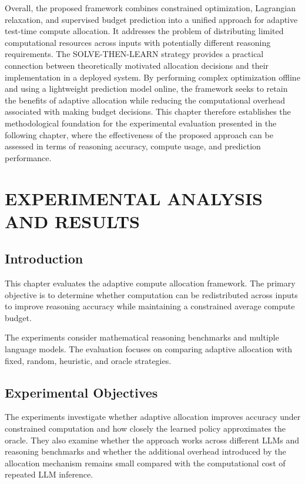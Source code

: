 \documentclass[12pt,a4paper,titlepage]{report}
\begin{document}
Overall, the proposed framework combines constrained optimization, Lagrangian relaxation, and supervised budget prediction into a unified approach for adaptive test-time compute allocation. It addresses the problem of distributing limited computational resources across inputs with potentially different reasoning requirements. The SOLVE-THEN-LEARN strategy provides a practical connection between theoretically motivated allocation decisions and their implementation in a deployed system. By performing complex optimization offline and using a lightweight prediction model online, the framework seeks to retain the benefits of adaptive allocation while reducing the computational overhead associated with making budget decisions. This chapter therefore establishes the methodological foundation for the experimental evaluation presented in the following chapter, where the effectiveness of the proposed approach can be assessed in terms of reasoning accuracy, compute usage, and prediction performance.


\chapter{EXPERIMENTAL ANALYSIS AND RESULTS}

\section{Introduction}

This chapter evaluates the adaptive compute allocation framework. The primary objective is to determine whether computation can be redistributed across inputs to improve reasoning accuracy while maintaining a constrained average compute budget.

The experiments consider mathematical reasoning benchmarks and multiple language models. The evaluation focuses on comparing adaptive allocation with fixed, random, heuristic, and oracle strategies.

\section{Experimental Objectives}

The experiments investigate whether adaptive allocation improves accuracy under constrained computation and how closely the learned policy approximates the oracle. They also examine whether the approach works across different LLMs and reasoning benchmarks and whether the additional overhead introduced by the allocation mechanism remains small compared with the computational cost of repeated LLM inference.
\end{document}
